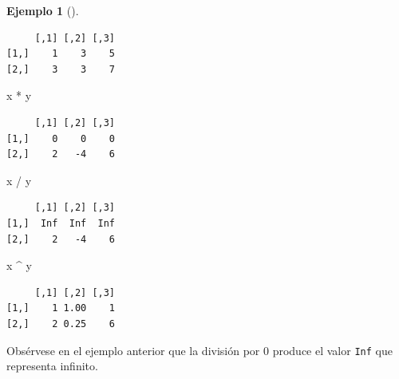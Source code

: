 \documentclass[
  a4paper,
]{scrreport}
\newenvironment{Shaded}{\begin{snugshade}}{\end{snugshade}}
\newcommand{\NormalTok}[1]{\textcolor[rgb]{0.00,0.23,0.31}{#1}}
\newcommand{\SpecialCharTok}[1]{\textcolor[rgb]{0.37,0.37,0.37}{#1}}
\theoremstyle{definition}
\theoremstyle{definition}
\newtheorem{example}{Ejemplo}[chapter]
\theoremstyle{remark}
\begin{document}
\begin{example}[]
\begin{verbatim}
     [,1] [,2] [,3]
[1,]    1    3    5
[2,]    3    3    7
\end{verbatim}

\begin{Shaded}
\begin{Highlighting}[]
\NormalTok{x }\SpecialCharTok{*}\NormalTok{ y}
\end{Highlighting}
\end{Shaded}

\begin{verbatim}
     [,1] [,2] [,3]
[1,]    0    0    0
[2,]    2   -4    6
\end{verbatim}

\begin{Shaded}
\begin{Highlighting}[]
\NormalTok{x }\SpecialCharTok{/}\NormalTok{ y}
\end{Highlighting}
\end{Shaded}

\begin{verbatim}
     [,1] [,2] [,3]
[1,]  Inf  Inf  Inf
[2,]    2   -4    6
\end{verbatim}

\begin{Shaded}
\begin{Highlighting}[]
\NormalTok{x }\SpecialCharTok{\^{}}\NormalTok{ y}
\end{Highlighting}
\end{Shaded}

\begin{verbatim}
     [,1] [,2] [,3]
[1,]    1 1.00    1
[2,]    2 0.25    6
\end{verbatim}

\end{example}

\begin{tcolorbox}[enhanced jigsaw, title=\textcolor{quarto-callout-warning-color}{\faExclamationTriangle}\hspace{0.5em}{Advertencia}, titlerule=0mm, toprule=.15mm, colbacktitle=quarto-callout-warning-color!10!white, arc=.35mm, colframe=quarto-callout-warning-color-frame, opacitybacktitle=0.6, coltitle=black, left=2mm, colback=white, opacityback=0, breakable, bottomrule=.15mm, toptitle=1mm, leftrule=.75mm, bottomtitle=1mm, rightrule=.15mm]

Obsérvese en el ejemplo anterior que la división por 0 produce el valor
\texttt{Inf} que representa infinito.

\end{tcolorbox}
\end{document}
